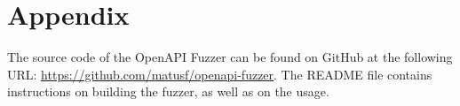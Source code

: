 \chapter*{Appendix}
The source code of the OpenAPI Fuzzer can be found on GitHub at the following URL: \url{https://github.com/matusf/openapi-fuzzer}. The README file contains instructions on building the fuzzer, as well as on the usage.
